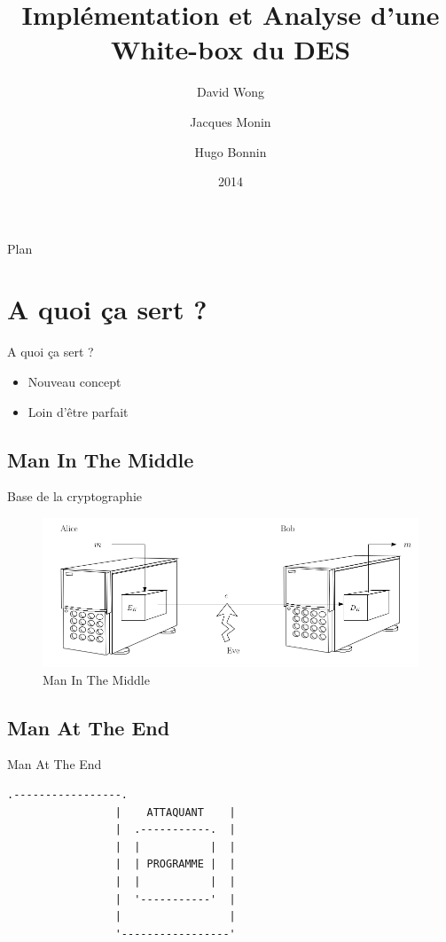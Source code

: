 \documentclass{beamer}
\author{David Wong
  \and Jacques Monin
  \and Hugo Bonnin}
\title{Implémentation et Analyse d'une White-box du DES}
\institute{Université de Bordeaux}
\date{2014}
\begin{document}
\begin{frame}
  \titlepage
\end{frame}

\begin{frame}{Plan}
  \tableofcontents
\end{frame}

\section{A quoi ça sert ?}

\begin{frame}{A quoi ça sert ?}
  \begin{itemize}
  \item Nouveau concept
  \item Loin d'être parfait
  \end{itemize}
\end{frame}

\subsection{Man In The Middle}

\begin{frame}{Base de la cryptographie}

  \begin{figure}[h]
    \centering
    \includegraphics[scale=0.50]{./images/alice_bob.png}
    \caption{Man In The Middle}
    \label{fig:keygen}
  \end{figure}

\end{frame}

\subsection{Man At The End}

\begin{frame}[fragile]{Man At The End}

\begin{Verbatim}[samepage=true]
                 .-----------------. 
                 |    ATTAQUANT    |
                 |  .-----------.  |  
                 |  |           |  |  
                 |  | PROGRAMME |  | 
                 |  |           |  | 
                 |  '-----------'  |
                 |                 |
                 '-----------------'
\end{Verbatim}
  
\end{frame}
\end{document}
